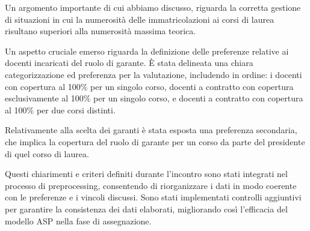 Un argomento importante di cui abbiamo discusso, riguarda la corretta gestione di situazioni in cui la
numerosità delle immatricolazioni ai corsi di laurea risultano superiori alla numerosità massima teorica.

Un aspetto cruciale emerso riguarda la definizione delle preferenze relative ai docenti incaricati
del ruolo di garante. È stata delineata una chiara categorizzazione ed preferenza per la valutazione, includendo in ordine:
i docenti con copertura al 100\% per un singolo corso, docenti a contratto con copertura esclusivamente al 100\% per un singolo corso,
e docenti a contratto con copertura al 100\% per due corsi distinti.

Relativamente alla scelta dei garanti è stata esposta una preferenza secondaria, che implica la copertura del ruolo di
garante per un corso da parte del presidente di quel corso di laurea.

Questi chiarimenti e criteri definiti durante l’incontro sono stati integrati nel processo di preprocessing,
consentendo di riorganizzare i dati in modo coerente con le preferenze e i vincoli discussi.
Sono stati implementati controlli aggiuntivi per garantire la consistenza dei dati elaborati,
migliorando così l'efficacia del modello ASP nella fase di assegnazione.
